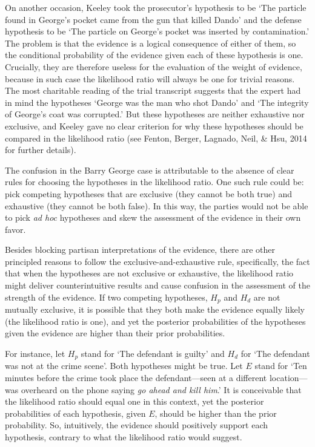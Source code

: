 \documentclass[
  10pt,
  dvipsnames,enabledeprecatedfontcommands]{scrartcl}
\begin{document}
On another occasion, Keeley took the prosecutor's hypothesis to be `The
particle found in George's pocket came from the gun that killed Dando'
and the defense hypothesis to be `The particle on George's pocket was
inserted by contamination.' The problem is that the evidence is a
logical consequence of either of them, so the conditional probability of
the evidence given each of these hypothesis is one. Crucially, they are
therefore useless for the evaluation of the weight of evidence, because
in such case the likelihood ratio will always be one for trivial
reasons. The most charitable reading of the trial transcript suggests
that the expert had in mind the hypotheses `George was the man who shot
Dando' and `The integrity of George's coat was corrupted.' But these
hypotheses are neither exhaustive nor exclusive, and Keeley gave no
clear criterion for why these hypotheses should be compared in the
likelihood ratio (see Fenton, Berger, Lagnado, Neil, \& Hsu, 2014 for
further details).

The confusion in the Barry George case is attributable to the absence of
clear rules for choosing the hypotheses in the likelihood ratio. One
such rule could be: pick competing hypotheses that are exclusive (they
cannot be both true) and exhaustive (they cannot be both false). In this
way, the parties would not be able to pick \textit{ad hoc} hypotheses
and skew the assessment of the evidence in their own favor.

Besides blocking partisan interpretations of the evidence, there are
other principled reasons to follow the exclusive-and-exhaustive rule,
specifically, the fact that when the hypotheses are not exclusive or
exhaustive, the likelihood ratio might deliver counterintuitive results
and cause confusion in the assessment of the strength of the evidence.
If two competing hypotheses, \(H_p\) and \(H_d\) are not mutually
exclusive, it is possible that they both make the evidence equally
likely (the likelihood ratio is one), and yet the posterior
probabilities of the hypotheses given the evidence are higher than their
prior probabilities.

For instance, let \(H_p\) stand for `The defendant is guilty' and
\(H_d\) for `The defendant was not at the crime scene'. Both hypotheses
might be true. Let \(E\) stand for `Ten minutes before the crime took
place the defendant---seen at a different location--- was overheard on
the phone saying \emph{go ahead and kill him}.' It is conceivable that
the likelihood ratio should equal one in this context, yet the posterior
probabilities of each hypothesis, given \(E\), should be higher than the
prior probability. So, intuitively, the evidence should positively
support each hypothesis, contrary to what the likelihood ratio would
suggest.
\end{document}
